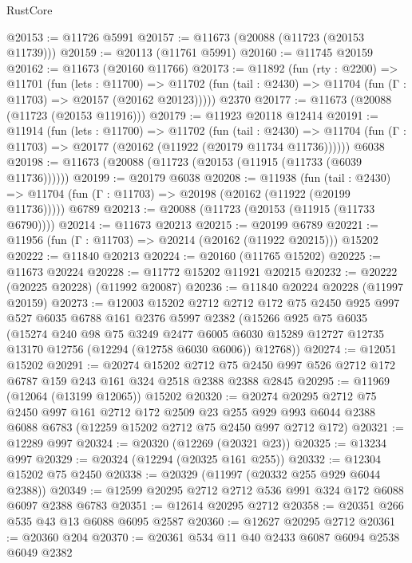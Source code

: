 \begin{lexlean}{RustCore}
\begin{coremodule}
@20153 := @11726 @5991
@20157 := @11673 (@20088 (@11723 (@20153 @11739)))
@20159 := @20113 (@11761 @5991)
@20160 := @11745 @20159
@20162 := @11673 (@20160 @11766)
@20173 := @11892
    (fun (rty : @2200) =>
    @11701
      (fun (lets : @11700) =>
      @11702 (fun (tail : @2430) => @11704 (fun (Γ : @11703) => @20157 (@20162 @20123)))))
    @2370
@20177 := @11673 (@20088 (@11723 (@20153 @11916)))
@20179 := @11923 @20118 @12414
@20191 := @11914
    (fun (lets : @11700) =>
    @11702
      (fun (tail : @2430) =>
      @11704 (fun (Γ : @11703) => @20177 (@20162 (@11922 (@20179 @11734 @11736))))))
    @6038
@20198 := @11673 (@20088 (@11723 (@20153 (@11915 (@11733 (@6039 @11736))))))
@20199 := @20179 @6038
@20208 := @11938
    (fun (tail : @2430) => @11704 (fun (Γ : @11703) => @20198 (@20162 (@11922 (@20199 @11736)))))
    @6789
@20213 := @20088 (@11723 (@20153 (@11915 (@11733 @6790))))
@20214 := @11673 @20213
@20215 := @20199 @6789
@20221 := @11956 (fun (Γ : @11703) => @20214 (@20162 (@11922 @20215))) @15202
@20222 := @11840 @20213
@20224 := @20160 (@11765 @15202)
@20225 := @11673 @20224
@20228 := @11772 @15202 @11921 @20215
@20232 := @20222 (@20225 @20228) (@11992 @20087)
@20236 := @11840 @20224 @20228 (@11997 @20159)
@20273 := @12003
    @15202
    @2712
    @2712
    @172
    @75
    @2450
    @925
    @997
    @527
    @6035
    @6788
    @161
    @2376
    @5997
    @2382
    (@15266
      @925
      @75
      @6035
      (@15274
        @240
        @98
        @75
        @3249
        @2477
        @6005
        @6030
        @15289
        @12727
        @12735
        @13170
        @12756
        (@12294 (@12758 @6030 @6006))
        @12768))
@20274 := @12051 @15202
@20291 := @20274
    @15202
    @2712
    @75
    @2450
    @997
    @526
    @2712
    @172
    @6787
    @159
    @243
    @161
    @324
    @2518
    @2388
    @2388
    @2845
@20295 := @11969 (@12064 (@13199 @12065)) @15202
@20320 := @20274
    @20295
    @2712
    @75
    @2450
    @997
    @161
    @2712
    @172
    @2509
    @23
    @255
    @929
    @993
    @6044
    @2388
    @6088
    @6783
    (@12259 @15202 @2712 @75 @2450 @997 @2712 @172)
@20321 := @12289 @997
@20324 := @20320 (@12269 (@20321 @23))
@20325 := @13234 @997
@20329 := @20324 (@12294 (@20325 @161 @255))
@20332 := @12304 @15202 @75 @2450
@20338 := @20329 (@11997 (@20332 @255 @929 @6044 @2388))
@20349 := @12599 @20295 @2712 @2712 @536 @991 @324 @172 @6088 @6097 @2388 @6783
@20351 := @12614 @20295 @2712
@20358 := @20351 @266 @535 @43 @13 @6088 @6095 @2587
@20360 := @12627 @20295 @2712
@20361 := @20360 @204
@20370 := @20361 @534 @11 @40 @2433 @6087 @6094 @2538 @6049 @2382

\end{coremodule}
\end{lexlean}

